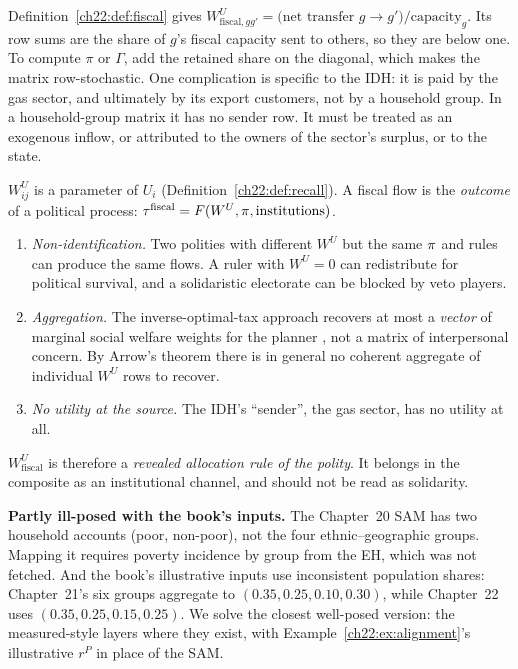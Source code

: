 \documentclass[../solutions_manual.tex]{subfiles}
\begin{document}
 Definition~\ref{ch22:def:fiscal} gives $W^U_{\text{fiscal},gg'} = \text{(net transfer } g \to g')/\text{capacity}_g$. Its row sums are the share of $g$'s fiscal capacity sent to others, so they are below one. To compute $\pi$ or $\Gamma$, add the retained share on the diagonal, which makes the matrix row-stochastic. One complication is specific to the IDH: it is paid by the gas sector, and ultimately by its export customers, not by a household group. In a household-group matrix it has no sender row. It must be treated as an exogenous inflow, or attributed to the owners of the sector's surplus, or to the state.

 $W^U_{ij}$ is a parameter of $U_i$ (Definition~\ref{ch22:def:recall}). A fiscal flow is the \emph{outcome} of a political process: $\tau^{\text{fiscal}} = F(W^U, \pi, \text{institutions})$.
\begin{enumerate}
\item \emph{Non-identification.} Two polities with different $W^U$ but the same $\pi$ and rules can produce the same flows. A ruler with $W^U = 0$ can redistribute for political survival, and a solidaristic electorate can be blocked by veto players.
\item \emph{Aggregation.} The inverse-optimal-tax approach recovers at most a \emph{vector} of marginal social welfare weights for the planner \citep{bourguignon2012tax}, not a matrix of interpersonal concern. By Arrow's theorem there is in general no coherent aggregate of individual $W^U$ rows to recover.
\item \emph{No utility at the source.} The IDH's ``sender'', the gas sector, has no utility at all.
\end{enumerate}
$W^U_{\text{fiscal}}$ is therefore a \emph{revealed allocation rule of the polity}. It belongs in the composite as an institutional channel, and should not be read as solidarity.


\textbf{Partly ill-posed with the book's inputs.} The Chapter~20 SAM has two household accounts (poor, non-poor), not the four ethnic--geographic groups. Mapping it requires poverty incidence by group from the EH, which was not fetched. And the book's illustrative inputs use inconsistent population shares: Chapter~21's six groups aggregate to $(0.35, 0.25, 0.10, 0.30)$, while Chapter~22 uses $(0.35, 0.25, 0.15, 0.25)$. We solve the closest well-posed version: the measured-style layers where they exist, with Example~\ref{ch22:ex:alignment}'s illustrative $r^P$ in place of the SAM.
\end{document}
